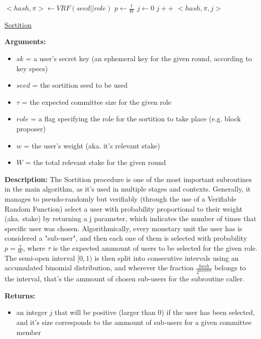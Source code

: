 \documentclass[10pt,a4paper]{article}
\begin{document}
\begin{algorithm}
    \begin{algorithmic}[H]
        \State $<hash, \pi> \gets VRF(seed||role)$
        \State $p \gets \frac{t}{W}$
        \State $j \gets 0$
        \While{$\frac{hash}{2^{hashlen}}\notin [ \sum_{k=0}^jB(k;w,p), \sum_{k=0}^{j+1}B(k;w,p))$}
            \State $j++$
        \EndWhile
        \Return $<hash,\pi,j>$
    \EndFunction
    \end{algorithmic}
    \caption{\underline{Sortition}}
\end{algorithm}


\textbf{Arguments:}
\begin{itemize}
    \item $sk$ = a user's secret key (an ephemeral key for the given round, according to key specs)
    \item $seed$ = the sortition seed to be used
    \item $\tau$ = the expected committee size for the given role
    \item $role$ = a flag specifying the role for the sortition to take place (e.g. block proposer)
    \item $w$ = the user's weight (aka. it's relevant stake)
    \item $W$ = the total relevant stake for the given round
  \end{itemize}


\textbf{Description:}
The Sortition procedure is one of the most important subroutines in the main algorithm, as it's used in multiple stages and contexts.
Generally, it manages to pseudo-randomly but verifiably (through the use of a Verifiable Random Function) select a user with probability proportional
to their weight (aka. stake) by returning a j parameter, which indicates the number of times that specific user was chosen.
Algorithmically, every monetary unit the user has is considered a "sub-user", and then each one of them is selected with probability $p = \frac{\tau}{W}$,
where $\tau$ is the expected ammount of users to be selected for the given role.
The semi-open interval $[0,1)$ is then split into consecutive intervals using an accumulated binomial distribution, and wherever the fraction $\frac{hash}{2^{hashlen}}$
belongs to the interval, that's the ammount of chosen sub-users for the subroutine caller.

\textbf{Returns:}
\begin{itemize}
    \item an integer $j$ that will be positive (larger than 0) if the user has been selected, and it's size corresponds to the ammount
    of sub-users for a given committee member
  \end{itemize}
\end{document}
